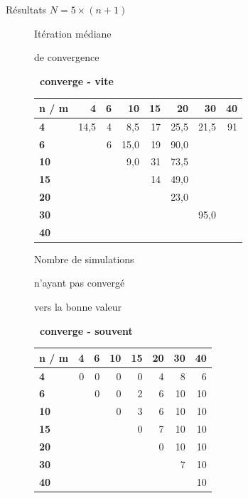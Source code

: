 \documentclass[10pt,xcolor=table,color={dvipsnames,usenames},ignorenonframetext,usepdftitle=false,french]{beamer}
\begin{document}
\begin{frame}{Résultats \(N=5\times (n+1)\)}
\protect\hypertarget{ruxe9sultats-n5times-n1}{}

\tiny
\begin{figure}
\begin{minipage}{.4\textwidth}
\normalsize{Itération médiane

de convergence

\faArrowCircleRight \textbf{\ converge - vite}
}
\end{minipage}%
\begin{minipage}{.6\textwidth}

\begin{tabular}{>{\bfseries}l|r|r|r|r|r|r|r}
\hline
\textbf{n / m } & \textbf{4} & \textbf{6} & \textbf{10} & \textbf{15} & \textbf{20} & \textbf{30} & \textbf{40}\\
\hline
4 & 14,5 & 4 & 8,5 & 17 & 25,5 & 21,5 & 91\\
\hline
6 &  & 6 & 15,0 & 19 & 90,0 &  & \\
\hline
10 &  &  & 9,0 & 31 & 73,5 &  & \\
\hline
15 &  &  &  & 14 & 49,0 &  & \\
\hline
20 &  &  &  &  & 23,0 &  & \\
\hline
30 &  &  &  &  &  & 95,0 & \\
\hline
40 &  &  &  &  &  &  & \\
\hline
\end{tabular}
\end{minipage}
\end{figure}

\begin{figure}
\begin{minipage}{.4\textwidth}
\normalsize{Nombre de simulations

n'ayant pas convergé

vers la bonne valeur

\faArrowCircleRight \textbf{\ converge - souvent}
}
\end{minipage}%
\begin{minipage}{.6\textwidth}

\begin{tabular}{>{\bfseries}l|r|r|r|r|r|r|r}
\hline
\textbf{n / m } & \textbf{4} & \textbf{6} & \textbf{10} & \textbf{15} & \textbf{20} & \textbf{30} & \textbf{40}\\
\hline
4 & 0 & 0 & 0 & 0 & 4 & 8 & 6\\
\hline
6 &  & 0 & 0 & 2 & 6 & 10 & 10\\
\hline
10 &  &  & 0 & 3 & 6 & 10 & 10\\
\hline
15 &  &  &  & 0 & 7 & 10 & 10\\
\hline
20 &  &  &  &  & 0 & 10 & 10\\
\hline
30 &  &  &  &  &  & 7 & 10\\
\hline
40 &  &  &  &  &  &  & 10\\
\hline
\end{tabular}


\end{minipage}
\end{figure}
\end{frame}
\end{document}
